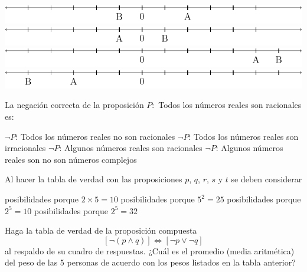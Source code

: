 \documentclass[10pt,letterpaper,addpoints]{exam}
\begin{document}
\begin{multicols}{2}
\begin{questions}
\begin{choices}
\CorrectChoice \includegraphics[scale=.5]{Images/respA.pdf} 
\choice \includegraphics[scale=.5]{Images/respB.pdf} 
\choice \includegraphics[scale=.5]{Images/respC.pdf} 
\choice \includegraphics[scale=.5]{Images/respD.pdf} 
  \end{choices}
  \question
  La negación correcta de la proposición $P:$ Todos los números reales son racionales es:
  \begin{choices}
  \choice $\neg P$: Todos los números reales no son racionales
  \choice $\neg P$: Todos los números reales son irracionales
  \CorrectChoice $\neg P$: Algunos números reales son racionales
  \choice $\neg P$: Algunos números reales son no son números complejos 
\end{choices}  
\question Al hacer la tabla de verdad con las proposiciones $p$, $q$, $r$, $s$ y $t$ se deben considerar
\begin{choices}
 posibilidades porque $2\times 5=10$
 posibilidades porque $5^{2}=25$
 posibilidades porque $2^{5}=10$
 posibilidades porque $2^{5}=32$
\end{choices}
\question Haga la tabla de verdad de la proposición compuesta 
\[[\neg(p\wedge q)]\Longleftrightarrow [\neg p \vee \neg q]\]
al respaldo de su cuadro de respuestas.
\question ¿Cuál es el promedio (media aritmética) del peso de las 5 personas de acuerdo con los pesos listados en la tabla anterior?


\end{questions}
\end{multicols}
\end{document}
